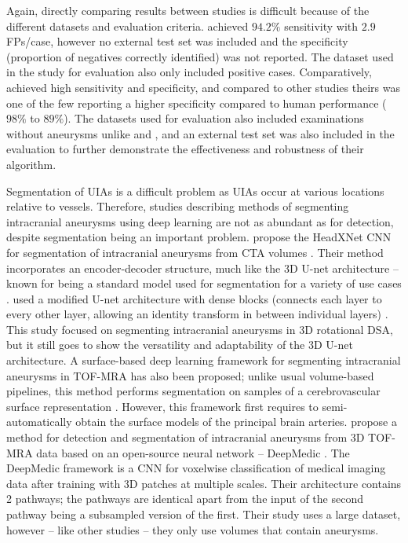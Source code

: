 Again, directly comparing results between studies is difficult because of the different datasets and evaluation criteria. \citeauthor{Nakao2018} achieved $94.2\%$ sensitivity with $2.9$ FPs/case, however no external test set was included and the specificity (proportion of negatives correctly identified) was not reported. The dataset used in the study for evaluation also only included positive cases. Comparatively, \citeauthor{Joo2020} achieved high sensitivity and specificity, and compared to other studies theirs was one of the few reporting a higher specificity compared to human performance ($98\%$ to $89\%$). The datasets used for evaluation also included examinations without aneurysms unlike \citeauthor{Ueda2019} and \citeauthor{Nakao2018}, and an external test set was also included in the evaluation to further demonstrate the effectiveness and robustness of their algorithm.

Segmentation of UIAs is a difficult problem as UIAs occur at various locations relative to vessels. Therefore, studies describing methods of segmenting intracranial aneurysms using deep learning are not as abundant as for detection, despite segmentation being an important problem. \citeauthor{Park2019} propose the HeadXNet CNN for segmentation of intracranial aneurysms from CTA volumes \cite{Park2019}. Their method incorporates an encoder-decoder structure, much like the 3D U-net architecture -- known for being a standard model used for segmentation for a variety of use cases \cite{3dunet}. \citeauthor{Liu2021} used a modified U-net architecture with dense blocks (connects each layer to every other layer, allowing an identity transform in between individual layers) \cite{Liu2021}. This study focused on segmenting intracranial aneurysms in 3D rotational DSA, but it still goes to show the versatility and adaptability  of the 3D U-net architecture. A surface-based deep learning framework for segmenting intracranial aneurysms in TOF-MRA has also been proposed; unlike usual volume-based pipelines, this method performs segmentation on samples of a cerebrovascular surface representation \cite{Yang2020}. However, this framework first requires to semi-automatically obtain the surface models of the principal brain arteries. \citeauthor{Sichermann2019} propose a method for detection and segmentation of intracranial aneurysms from 3D TOF-MRA data based on an open-source neural network --  DeepMedic \cite{Sichermann2019}. The DeepMedic framework is a CNN for voxelwise classification of medical imaging data after training with 3D patches at multiple scales. Their architecture contains 2 pathways; the pathways are identical apart from the input of the second pathway being a subsampled version of the first. Their study uses a large dataset, however -- like other studies -- they only use volumes that contain aneurysms. 


